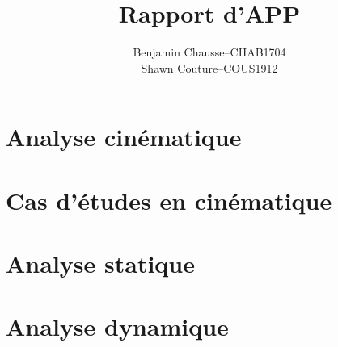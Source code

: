 \documentclass[a4paper]{article} \usepackage{tabularx}
\title{Rapport d'APP}
\author{
  \addtolength{\tabcolsep}{-0.4em}
  \begin{tabular}{rcl} %
      Benjamin Chausse & -- & CHAB1704 \\
      Shawn Couture    & -- & COUS1912 \\
  \end{tabular}
}
\begin{document}
\maketitle
\tableofcontents
\newpage

\section{Analyse cinématique}


\section{Cas d'études en cinématique}



\section{Analyse statique}


\section{Analyse dynamique}



\end{document}
